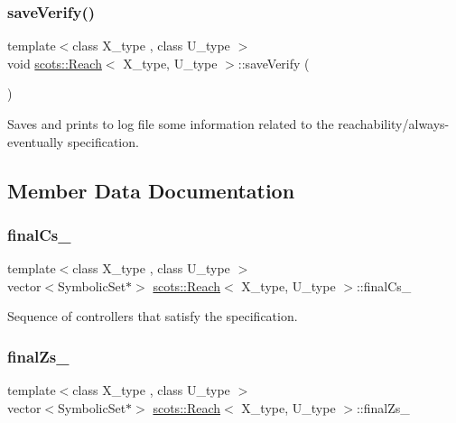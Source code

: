 \subsubsection{\texorpdfstring{save\+Verify()}{saveVerify()}}
{\footnotesize\ttfamily template$<$class X\+\_\+type , class U\+\_\+type $>$ \\
void \hyperlink{classscots_1_1Reach}{scots\+::\+Reach}$<$ X\+\_\+type, U\+\_\+type $>$\+::save\+Verify (\begin{DoxyParamCaption}{ }\end{DoxyParamCaption})\hspace{0.3cm}{\ttfamily [inline]}}

Saves and prints to log file some information related to the reachability/always-\/eventually specification. 

\subsection{Member Data Documentation}
\mbox{\label{classscots_1_1Reach_a42e41806d2c3308e41de9b21afae2206}} 
\subsubsection{\texorpdfstring{final\+Cs\+\_\+}{finalCs\_}}
{\footnotesize\ttfamily template$<$class X\+\_\+type , class U\+\_\+type $>$ \\
vector$<$Symbolic\+Set$\ast$$>$ \hyperlink{classscots_1_1Reach}{scots\+::\+Reach}$<$ X\+\_\+type, U\+\_\+type $>$\+::final\+Cs\+\_\+}

Sequence of controllers that satisfy the specification. \mbox{\label{classscots_1_1Reach_ae607710b3da219ec741f8609f870bafd}} 
\subsubsection{\texorpdfstring{final\+Zs\+\_\+}{finalZs\_}}
{\footnotesize\ttfamily template$<$class X\+\_\+type , class U\+\_\+type $>$ \\
vector$<$Symbolic\+Set$\ast$$>$ \hyperlink{classscots_1_1Reach}{scots\+::\+Reach}$<$ X\+\_\+type, U\+\_\+type $>$\+::final\+Zs\+\_\+}


